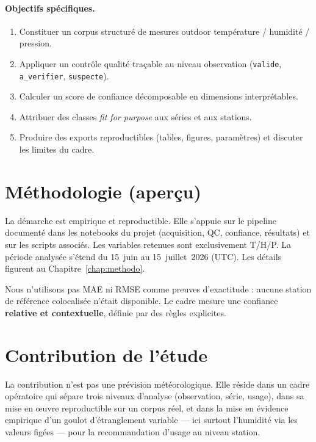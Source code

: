 \documentclass[12pt,a4paper]{report}
\begin{document}
\paragraph{Objectifs spécifiques.}
\begin{enumerate}
  \item Constituer un corpus structuré de mesures outdoor température /
        humidité / pression.
  \item Appliquer un contrôle qualité traçable au niveau observation
        (\texttt{valide}, \texttt{a\_verifier}, \texttt{suspecte}).
  \item Calculer un score de confiance décomposable en dimensions
        interprétables.
  \item Attribuer des classes \textit{fit for purpose} aux séries et aux
        stations.
  \item Produire des exports reproductibles (tables, figures, paramètres) et
        discuter les limites du cadre.
\end{enumerate}

\section*{Méthodologie (aperçu)}

La démarche est empirique et reproductible. Elle s'appuie sur le pipeline
documenté dans les notebooks du projet (acquisition, QC, confiance, résultats)
et sur les scripts associés. Les variables retenues sont exclusivement T/H/P.
La période analysée s'étend du 15~juin au 15~juillet~2026 (UTC). Les détails
figurent au Chapitre~\ref{chap:methodo}.

Nous n'utilisons pas MAE ni RMSE comme preuves d'exactitude : aucune station
de référence colocalisée n'était disponible. Le cadre mesure une confiance
\textbf{relative et contextuelle}, définie par des règles explicites.

\section*{Contribution de l'étude}

La contribution n'est pas une prévision météorologique. Elle réside dans un
cadre opératoire qui sépare trois niveaux d'analyse (observation, série,
usage), dans sa mise en œuvre reproductible sur un corpus réel, et dans la
mise en évidence empirique d'un goulot d'étranglement variable --- ici surtout
l'humidité via les valeurs figées --- pour la recommandation d'usage au niveau
station.
\end{document}
